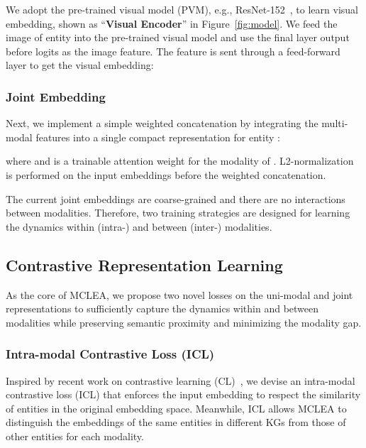 \documentclass[11pt]{article}
\begin{document}
We adopt the pre-trained visual model (PVM), e.g., ResNet-152~\cite{he2016deep}, to learn visual embedding, shown as ``\textbf{Visual Encoder}'' in Figure~\ref{fig:model}.
We feed the image  of entity  into the pre-trained visual model and use the final layer output before logits as the image feature.
The feature is sent through a feed-forward layer to get the visual embedding:


\subsubsection{Joint Embedding}

Next, we implement a simple weighted concatenation by integrating the multi-modal features into a single compact representation  for entity :
\begin{small}

\end{small}\noindent
where  and  is a trainable attention weight for the modality of . L2-normalization is performed on the input embeddings before the weighted concatenation.



The current joint embeddings are coarse-grained and there are no interactions between modalities. 
Therefore, two training strategies are designed for learning the dynamics within (intra-) and between (inter-) modalities.

\subsection{Contrastive Representation Learning}
\label{sec:cl}

As the core of MCLEA, we propose two novel losses on the uni-modal and joint representations to sufficiently capture the dynamics within and between modalities while preserving semantic proximity and minimizing the modality gap.

\subsubsection{Intra-modal Contrastive Loss (ICL)} 

Inspired by recent work on contrastive learning (CL)~\cite{chen2020simple,khosla2020supervised}, we devise an intra-modal contrastive loss (ICL) that enforces the input embedding to respect the similarity of entities in the original embedding space.
Meanwhile, ICL allows MCLEA to distinguish the embeddings of the same entities in different KGs from those of other entities for each modality.
\end{document}
